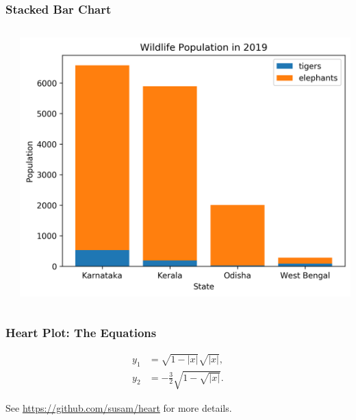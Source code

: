 \documentclass[xcolor={svgnames}]{beamer}
\newcommand{\pyfile}[2][]{}
\begin{document}
\begin{frame}[t,fragile]
    \frametitle{Stacked Bar Chart}
    \vspace{-2mm}
    \begin{columns}[T]
        \begin{column}{0.54\textwidth}
            \pyfile[style=scriptsize]{examples/20-bar-stacked.py}
        \end{column}
        \begin{column}{0.46\textwidth}
            \includegraphics[width=\textwidth]{img/20-bar-stacked.png}
        \end{column}
    \end{columns}
\end{frame}


\begin{frame}
    \frametitle{Heart Plot: The Equations}

    \begin{align*}
        y_1 & = \sqrt{1 - |x|} \sqrt{|x|}, \\
        y_2 & = -\frac{3}{2} \sqrt{1 - \sqrt{|x|}}.
    \end{align*}

    \bigskip

    \bigskip

    \begin{center}
        See \url{https://github.com/susam/heart} for more details.
    \end{center}
\end{frame}
\end{document}
